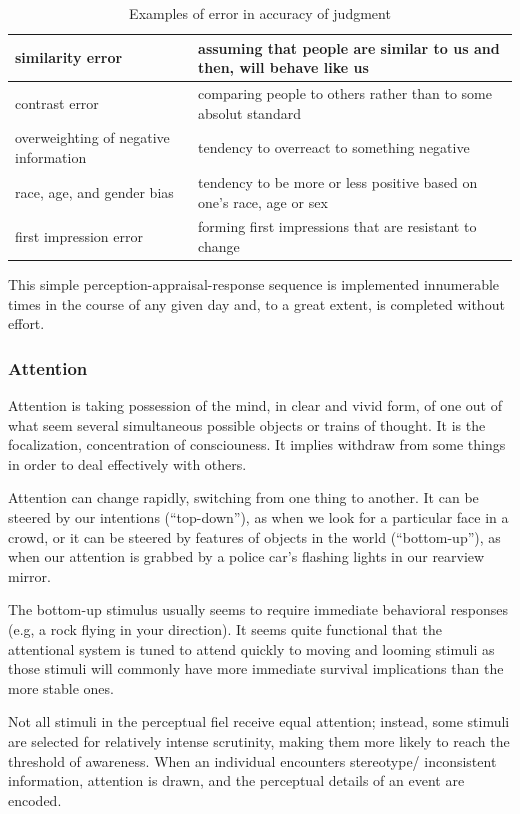 \documentclass[12pt,article,oneside,a4paper]{memoir}
\begin{document}
\begin{table}
  \begin{tabular}{ p{5cm} |  p{10cm} }
    \hline
    similarity error & assuming that people are similar to us and then, will
    behave like us \\ \hline
    contrast error & comparing people to others rather than to some absolut
    standard \\ \hline
    overweighting of negative information & tendency to overreact to something
    negative \\ \hline
    race, age, and gender bias & tendency to be more or less positive based on
    one's race, age or sex \\ \hline
	first impression error & forming first impressions that are resistant to
	change \\ 
    \hline
  \end{tabular}
  \caption{Examples of error in accuracy of judgment}
  \label{table:accuracy-judgment}
\end{table}

This simple perception-appraisal-response sequence is implemented innumerable
times in the course of any given day and, to a great extent, is completed
without effort.

\subsubsection{Attention}
Attention is taking possession of the mind, in clear and vivid form, of one out
of what seem several simultaneous possible objects or trains of thought. It is
the focalization, concentration of consciouness. It implies withdraw from some
things in order to deal effectively with others.

Attention can change rapidly, switching from one thing to another. It can be
steered by our intentions (``top-down''), as when we look for a particular face
in a crowd, or it can be steered by features of objects in the world
(``bottom-up''), as when our attention is grabbed by a police car's flashing
lights in our rearview mirror.

The bottom-up stimulus usually seems to require immediate behavioral responses
(e.g, a rock flying in your direction). It seems quite functional that the
attentional system is tuned to attend quickly to moving and looming stimuli as
those stimuli will commonly have more immediate survival implications than the
more stable ones.

Not all stimuli in the perceptual fiel receive equal attention; instead, some
stimuli are selected for relatively intense scrutinity, making them more likely
to reach the threshold of awareness. When an individual encounters stereotype/
inconsistent information, attention is drawn, and the perceptual details of an
event are encoded.
\end{document}
